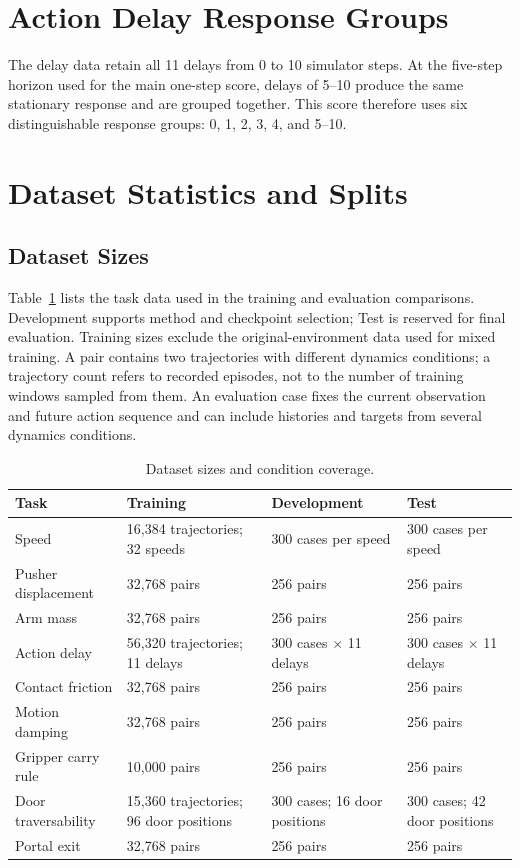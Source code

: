 \section{Action Delay Response Groups}
\label{app:delay-groups}

The delay data retain all 11 delays from 0 to 10 simulator steps.
At the five-step horizon used for the main one-step score, delays of 5--10 produce the same stationary response and are grouped together.
This score therefore uses six distinguishable response groups: 0, 1, 2, 3, 4, and 5--10.

\section{Dataset Statistics and Splits}
\label{app:dataset-splits}

\subsection{Dataset Sizes}

Table~\ref{tab:dataset-sizes} lists the task data used in the training and evaluation comparisons.
Development supports method and checkpoint selection; Test is reserved for final evaluation.
Training sizes exclude the original-environment data used for mixed training.
A pair contains two trajectories with different dynamics conditions; a trajectory count refers to recorded episodes, not to the number of training windows sampled from them.
An evaluation case fixes the current observation and future action sequence and can include histories and targets from several dynamics conditions.

\begin{table}[!t]
\centering
\small
\caption{Dataset sizes and condition coverage.}
\label{tab:dataset-sizes}
\begin{tabularx}{\textwidth}{@{}lXXX@{}}
\toprule
Task & Training & Development & Test \\
\midrule
Speed & 16,384 trajectories; 32 speeds & 300 cases per speed & 300 cases per speed \\
Pusher displacement & 32,768 pairs & 256 pairs & 256 pairs \\
Arm mass & 32,768 pairs & 256 pairs & 256 pairs \\
Action delay & 56,320 trajectories; 11 delays & 300 cases $\times$ 11 delays & 300 cases $\times$ 11 delays \\
Contact friction & 32,768 pairs & 256 pairs & 256 pairs \\
Motion damping & 32,768 pairs & 256 pairs & 256 pairs \\
Gripper carry rule & 10,000 pairs & 256 pairs & 256 pairs \\
Door traversability & 15,360 trajectories; 96 door positions & 300 cases; 16 door positions & 300 cases; 42 door positions \\
Portal exit & 32,768 pairs & 256 pairs & 256 pairs \\
\bottomrule
\end{tabularx}
\end{table}

